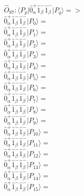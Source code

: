 \documentclass[14pt]{article}
\begin{document}
    $\hat{O}_{87}:  \langle{P_p}\vert \hat{0}_{\alpha}^{+}\hat{1}_{\beta}^{-}\hat{1}_{\beta}^{-} \vert{P_q}\rangle => $ \\ 
    $ \hat{0}_{\alpha}^{+}\hat{1}_{\beta}^{-}\hat{1}_{\beta}^{-} \vert{P_{0}}\rangle =  $ \\ 
    $ \hat{0}_{\alpha}^{+}\hat{1}_{\beta}^{-}\hat{1}_{\beta}^{-} \vert{P_{1}}\rangle =  $ \\ 
    $ \hat{0}_{\alpha}^{+}\hat{1}_{\beta}^{-}\hat{1}_{\beta}^{-} \vert{P_{2}}\rangle =  $ \\ 
    $ \hat{0}_{\alpha}^{+}\hat{1}_{\beta}^{-}\hat{1}_{\beta}^{-} \vert{P_{3}}\rangle =  $ \\ 
    $ \hat{0}_{\alpha}^{+}\hat{1}_{\beta}^{-}\hat{1}_{\beta}^{-} \vert{P_{4}}\rangle =  $ \\ 
    $ \hat{0}_{\alpha}^{+}\hat{1}_{\beta}^{-}\hat{1}_{\beta}^{-} \vert{P_{5}}\rangle =  $ \\ 
    $ \hat{0}_{\alpha}^{+}\hat{1}_{\beta}^{-}\hat{1}_{\beta}^{-} \vert{P_{6}}\rangle =  $ \\ 
    $ \hat{0}_{\alpha}^{+}\hat{1}_{\beta}^{-}\hat{1}_{\beta}^{-} \vert{P_{7}}\rangle =  $ \\ 
    $ \hat{0}_{\alpha}^{+}\hat{1}_{\beta}^{-}\hat{1}_{\beta}^{-} \vert{P_{8}}\rangle =  $ \\ 
    $ \hat{0}_{\alpha}^{+}\hat{1}_{\beta}^{-}\hat{1}_{\beta}^{-} \vert{P_{9}}\rangle =  $ \\ 
    $ \hat{0}_{\alpha}^{+}\hat{1}_{\beta}^{-}\hat{1}_{\beta}^{-} \vert{P_{10}}\rangle =  $ \\ 
    $ \hat{0}_{\alpha}^{+}\hat{1}_{\beta}^{-}\hat{1}_{\beta}^{-} \vert{P_{11}}\rangle =  $ \\ 
    $ \hat{0}_{\alpha}^{+}\hat{1}_{\beta}^{-}\hat{1}_{\beta}^{-} \vert{P_{12}}\rangle =  $ \\ 
    $ \hat{0}_{\alpha}^{+}\hat{1}_{\beta}^{-}\hat{1}_{\beta}^{-} \vert{P_{13}}\rangle =  $ \\ 
    $ \hat{0}_{\alpha}^{+}\hat{1}_{\beta}^{-}\hat{1}_{\beta}^{-} \vert{P_{14}}\rangle =  $ \\ 
    $ \hat{0}_{\alpha}^{+}\hat{1}_{\beta}^{-}\hat{1}_{\beta}^{-} \vert{P_{15}}\rangle =  $ \\ 
    
\end{document}
